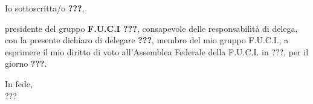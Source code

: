\documentclass{fuci-article}
\date{???, \today}
\begin{document}
\vspace{25pt}

\noindent
Io sottoscritta/o \textbf{???},

\vspace{25pt}

\noindent
presidente del gruppo \textbf{F.U.C.I ???}, consapevole delle responsabilità di
delega, con la presente dichiaro di delegare \textbf{???}, membro del mio gruppo
F.U.C.I., a esprimere il mio diritto di voto all'Assemblea Federale della
F.U.C.I. in ???, per il giorno \textbf{???}.

\vspace{25pt}

\begin{flushright}
  In fede, \\
  ???
\end{flushright}
\end{document}
